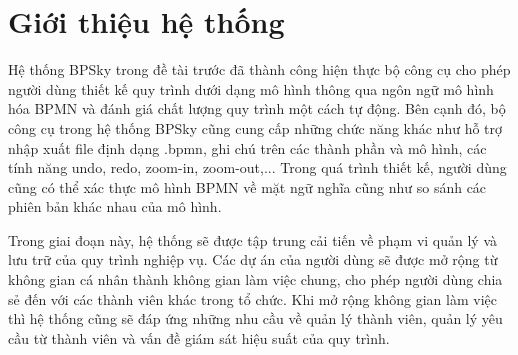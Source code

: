 \section{Giới thiệu hệ thống}
Hệ thống BPSky trong đề tài trước đã thành công hiện thực bộ công cụ cho phép người dùng thiết kế quy trình dưới dạng mô hình thông qua ngôn ngữ mô hình hóa BPMN và đánh giá chất lượng quy trình một cách tự động. Bên cạnh đó, bộ công cụ trong hệ thống BPSky cũng cung cấp những chức năng khác như hỗ trợ nhập xuất file định dạng .bpmn, ghi chú trên các thành phần và mô hình, các tính năng undo, redo, zoom-in, zoom-out,... Trong quá trình thiết kế, người dùng cũng có thể xác thực mô hình BPMN về mặt ngữ nghĩa cũng như so sánh các phiên bản khác nhau của mô hình.
\par
Trong giai đoạn này, hệ thống sẽ được tập trung cải tiến về phạm vi quản lý và lưu trữ của quy trình nghiệp vụ. Các dự án của người dùng sẽ được mở rộng từ không gian cá nhân thành không gian làm việc chung, cho phép người dùng chia sẻ đến với các thành viên khác trong tổ chức. Khi mở rộng không gian làm việc thì hệ thống cũng sẽ đáp ứng những nhu cầu về quản lý thành viên, quản lý yêu cầu từ thành viên và vấn đề giám sát hiệu suất của quy trình.

